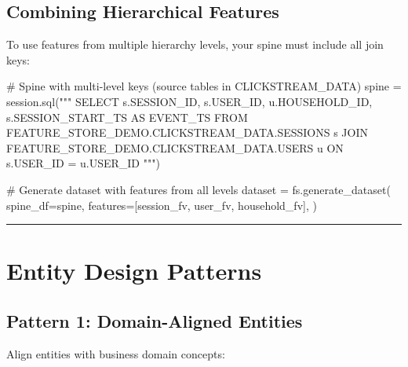 \documentclass[
  letterpaper,
  DIV=11,
  numbers=noendperiod]{scrreprt}
\newenvironment{Shaded}{\begin{snugshade}}{\end{snugshade}}
\newcommand{\CommentTok}[1]{\textcolor[rgb]{0.37,0.37,0.37}{#1}}
\newcommand{\NormalTok}[1]{\textcolor[rgb]{0.00,0.23,0.31}{#1}}
\newcommand{\OperatorTok}[1]{\textcolor[rgb]{0.37,0.37,0.37}{#1}}
\newcommand{\StringTok}[1]{\textcolor[rgb]{0.13,0.47,0.30}{#1}}
\begin{document}
\hypertarget{combining-hierarchical-features}{%
\subsection{Combining Hierarchical
Features}\label{combining-hierarchical-features}}

To use features from multiple hierarchy levels, your spine must include
all join keys:

\begin{Shaded}
\begin{Highlighting}[]
\CommentTok{\# Spine with multi{-}level keys (source tables in CLICKSTREAM\_DATA)}
\NormalTok{spine }\OperatorTok{=}\NormalTok{ session.sql(}\StringTok{"""}
\StringTok{    SELECT}
\StringTok{        s.SESSION\_ID,}
\StringTok{        s.USER\_ID,}
\StringTok{        u.HOUSEHOLD\_ID,}
\StringTok{        s.SESSION\_START\_TS AS EVENT\_TS}
\StringTok{    FROM FEATURE\_STORE\_DEMO.CLICKSTREAM\_DATA.SESSIONS s}
\StringTok{    JOIN FEATURE\_STORE\_DEMO.CLICKSTREAM\_DATA.USERS u}
\StringTok{      ON s.USER\_ID = u.USER\_ID}
\StringTok{"""}\NormalTok{)}

\CommentTok{\# Generate dataset with features from all levels}
\NormalTok{dataset }\OperatorTok{=}\NormalTok{ fs.generate\_dataset(}
\NormalTok{    spine\_df}\OperatorTok{=}\NormalTok{spine,}
\NormalTok{    features}\OperatorTok{=}\NormalTok{[session\_fv, user\_fv, household\_fv],}
\NormalTok{)}
\end{Highlighting}
\end{Shaded}

\begin{center}\rule{0.5\linewidth}{0.5pt}\end{center}

\hypertarget{entity-design-patterns}{%
\section{Entity Design Patterns}\label{entity-design-patterns}}

\hypertarget{pattern-1-domain-aligned-entities}{%
\subsection{Pattern 1: Domain-Aligned
Entities}\label{pattern-1-domain-aligned-entities}}

Align entities with business domain concepts:
\end{document}
